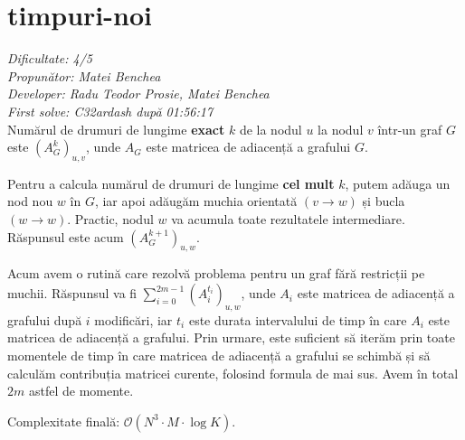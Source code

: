 \section{timpuri-noi}
\textit{Dificultate: 4/5} \\
\textit{Propunător: Matei Benchea} \\
\textit{Developer: Radu Teodor Prosie, Matei Benchea} \\
\textit{First solve: C32ardash după 01:56:17}  \\

Numărul de drumuri de lungime \textbf{exact} $k$ de la nodul $u$ la nodul $v$ într-un graf $G$ este $(A_G^k)_{u,v}$, unde $A_G$ este matricea de adiacență a grafului $G$.

Pentru a calcula numărul de drumuri de lungime \textbf{cel mult} $k$, putem adăuga un nod nou $w$ în $G$, iar apoi adăugăm muchia orientată $(v \to w)$ și bucla $(w \to w)$. Practic, nodul $w$ va acumula toate rezultatele intermediare. Răspunsul este acum $(A_G^{k+1})_{u,w}$.

Acum avem o rutină care rezolvă problema pentru un graf fără restricții pe muchii. Răspunsul va fi $\sum_{i=0}^{2m-1} (A_i^{t_i})_{u,w}$, unde $A_i$ este matricea de adiacență a grafului după $i$ modificări, iar $t_i$ este durata intervalului de timp în care $A_i$ este matricea de adiacență a grafului. Prin urmare, este suficient să iterăm prin toate momentele de timp în care matricea de adiacență a grafului se schimbă și să calculăm contribuția matricei curente, folosind formula de mai sus. Avem în total $2m$ astfel de momente.

\medskip

Complexitate finală: $\mathcal{O}(N^3 \cdot M \cdot \log K)$.
